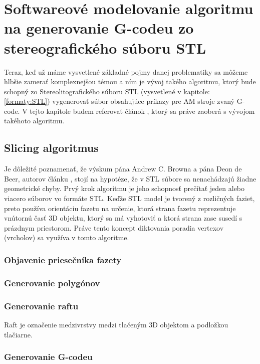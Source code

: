 \documentclass[10pt,twoside,slovak,a4paper]{article}
\begin{document}
\section{Softwareové modelovanie algoritmu na generovanie G-codeu zo stereografického súboru STL}\label{Slicer_vyvoj}
   Teraz, keď už máme vysvetlené základné pojmy danej problematiky sa môžeme hlbšie zamerať komplexnejšou témou a ním je vývoj takého algoritmu, ktorý bude schopný zo Stereolitografického súboru STL (vysvetlené v kapitole: \ref{formaty:STL}) vygenerovať súbor obsahujúce príkazy pre AM stroje zvaný G-code.
\newline
    V tejto kapitole budem referovať článok \cite{6757836}, ktorý sa práve zaoberá s vývojom takéhoto algoritmu.
\subsection{Slicing algoritmus}\label{Slicer_vyvoj:Slicing}
    Je dôležité poznamenať, že výskum pána Andrew C. Browna a pána Deon de Beer, autorov článku \cite{6757836}, stojí na hypotéze, že v STL súbore sa nenachádzajú žiadne geometrické chyby.
     \newline Prvý krok algoritmu je jeho schopnosť prečítať jeden alebo viacero súborov vo formáte STL. Keďže STL model je tvorený z rozličných faziet, preto používa orientáciu fazetu na určenie, ktorá strana fazetu reprezentuje vnútornú časť 3D objektu, ktorý sa má vyhotoviť a ktorá strana zase susedí s prázdnym priestorom. Práve tento koncept diktovania poradia vertexov (vrcholov) sa využíva v tomto algoritme.
\subsubsection{Objavenie priesečníka fazety}

\subsubsection{Generovanie polygónov}

\subsubsection{Generovanie raftu}
Raft je označenie medzivrstvy medzi tlačeným 3D objektom a podložkou tlačiarne.
\subsubsection{Generovanie G-codeu}
\end{document}
